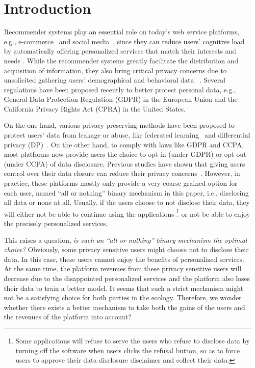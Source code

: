\section{Introduction}

Recommender systems play an essential role on today's web service platforms, e.g., e-commerce~\cite{Linden:IC03:Amazon,xie21explore} and social media~\cite{Covington:recsys16:Deep,Ying:kdd18:Graph}, since they can reduce users' cognitive load by automatically offering personalized services that match their interests and needs \cite{chin2007information}.
While the recommender systems greatly facilitate the distribution and acquisition of information, they also bring critical privacy concerns due to unsolicited gathering users' demographical and behavioral data ~\cite{Smith:mis96:Information,zhang2021membership}. %
Several regulations have been proposed recently to better protect personal data, e.g., General Data Protection Regulation (GDPR) in the European Union and the California Privacy Rights Act (CPRA) in the United States. %


On the one hand, various privacy-preserving methods have been proposed to protect users' data from leakage or abuse, like federated learning~\cite{Lin:sigir20:Meta,Muhammad:kdd20:FedFast,Qi:emnlp20:Privacy,Minto:recsys21:Stronger} and differential privacy (DP)~\cite{McSherry:kdd09:Differentially,Berlioz:recsys15:Applying,shin2018privacy,Gao:sigir20:DPLCF}.
On the other hand, to comply with laws like GDPR and CCPA, most platforms now provide users the choice to opt-in (under GDPR) or opt-out (under CCPA) of data disclosure.
Previous studies have shown that giving users control over their data closure can reduce their privacy concerns~\cite{Zhang2014-oa,Chen:CHI18:This}.
However, in practice, these platforms mostly only provide a very coarse-grained option for each user, named ``all or nothing'' binary mechanism in this paper, i.e., disclosing all data or none at all.
Usually, if the users choose to not disclose their data, they will either not be able to continue using the applications \footnote{Some applications will refuse to serve the users who refuse to disclose data by turning off the software when users clicks the refusal button, so as to force users to approve their data disclosure disclaimer and collect their data.} or not be able to enjoy the precisely personalized services.




This raises a question, \textit{is such an ``all or nothing'' binary mechanism the optimal choice?}
Obviously, some privacy sensitive users might choose not to disclose their data.
In this case, these users cannot
enjoy the benefits of personalized services.
At the same time, the platform revenues from these privacy sensitive users will decrease due to the disappointed personalized services and the platform also loses their data to train a better model.
It seems that such a strict mechanism might not be a satisfying choice for both parties in the ecology.
Therefore, we wonder whether there exists a better mechanism to take both the gains of the users and the revenues of the platform into account?




